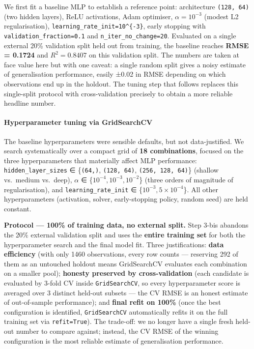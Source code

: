 We first fit a baseline MLP to establish a reference point: architecture
\texttt{(128,\ 64)} (two hidden layers), ReLU activations, Adam
optimiser, \(\alpha = 10^{-3}\) (modest L2 regularisation),
\texttt{learning\_rate\_init=10\^{}\{-3\}}, early stopping with
\texttt{validation\_fraction=0.1} and \texttt{n\_iter\_no\_change=20}.
Evaluated on a single external 20\% validation split held out from
training, the baseline reaches \textbf{RMSE = 0.1724} and
\textbf{\(R^2 = 0.8407\)} on this validation split. The numbers are
taken at face value here but with one caveat: a single random split
gives a noisy estimate of generalisation performance, easily ±0.02 in
RMSE depending on which observations end up in the holdout. The tuning
step that follows replaces this single-split protocol with
cross-validation precisely to obtain a more reliable headline number.

\paragraph{Hyperparameter tuning via
GridSearchCV}\label{hyperparameter-tuning-via-gridsearchcv}

The baseline hyperparameters were sensible defaults, but not
data-justified. We search systematically over a compact grid of
\textbf{18 combinations}, focused on the three hyperparameters that
materially affect MLP performance: \texttt{hidden\_layer\_sizes} ∈
\{\texttt{(64,)}, \texttt{(128,\ 64)}, \texttt{(256,\ 128,\ 64)}\}
(shallow vs.~medium vs.~deep), \(\alpha\) ∈
\{\(10^{-4}, 10^{-3}, 10^{-2}\)\} (three orders of magnitude of
regularisation), and \texttt{learning\_rate\_init} ∈
\{\(10^{-3}, 5 \times 10^{-4}\)\}. All other hyperparameters
(activation, solver, early-stopping policy, random seed) are held
constant.

\textbf{Protocol --- 100\% of training data, no external split.} Step
3-bis abandons the 20\% external validation split and uses the
\textbf{entire training set} for both the hyperparameter search and the
final model fit. Three justifications: \textbf{data efficiency} (with
only 1460 observations, every row counts --- reserving 292 of them as an
untouched holdout means GridSearchCV evaluates each combination on a
smaller pool); \textbf{honesty preserved by cross-validation} (each
candidate is evaluated by 3-fold CV inside \texttt{GridSearchCV}, so
every hyperparameter score is averaged over 3 distinct held-out subsets
--- the CV RMSE is an honest estimate of out-of-sample performance); and
\textbf{final refit on 100\%} (once the best configuration is
identified, \texttt{GridSearchCV} automatically refits it on the full
training set via \texttt{refit=True}). The trade-off: we no longer have
a single fresh held-out number to compare against; instead, the CV RMSE
of the winning configuration is the most reliable estimate of
generalisation performance.

